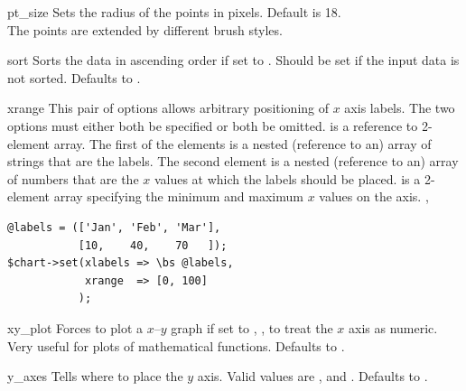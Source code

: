 \constructorblurb{\thisname}

\begin{AttrDecl}{pt\_size}
Sets the radius of the points in pixels. Default is 18.\\
The points are extended by different brush styles.
\end{AttrDecl}

\begin{AttrDecl}{sort}
Sorts the data in ascending order if set to . Should be
set if the input data is not sorted. Defaults to .
\end{AttrDecl}

\begin{AttrDecl}{xrange}
This pair of options allows arbitrary positioning of $x$ axis labels.
The two options must either both be specified or both be omitted.
 is a reference to 2-element array. The first of the
elements is a nested (reference to an) array of strings that are the
labels. The second element is a nested (reference to an) array of
numbers that are the $x$ values at which the labels should be placed.
 is a 2-element array specifying the minimum and maximum
$x$ values on the axis. \Eg,
\begin{verbatim}
@labels = (['Jan', 'Feb', 'Mar'],
           [10,    40,    70   ]);
$chart->set(xlabels => \bs @labels,
            xrange  => [0, 100]
           );
\end{verbatim}
\end{AttrDecl}

\begin{AttrDecl}{xy\_plot}
Forces \thisclass to plot a $x$--$y$ graph if set to ,
\ie, to treat the $x$ axis as numeric. Very useful for plots of
mathematical functions. Defaults to .
\end{AttrDecl}

\begin{AttrDecl}{y\_axes}
Tells \thisclass where to place the $y$ axis. Valid
values are ,  and . Defaults
to .
\end{AttrDecl}
